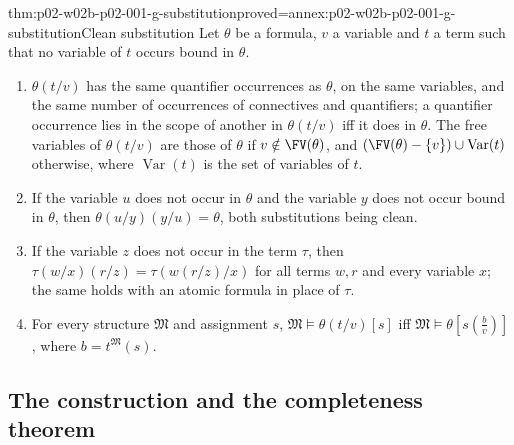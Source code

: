 \begin{hblemma}{thm:p02-w02b-p02-001-g-substitution}{proved=annex:p02-w02b-p02-001-g-substitution}{Clean substitution}
Let \(\theta\) be a formula, \(v\) a variable and \(t\) a term such that no
variable of \(t\) occurs bound in \(\theta\).
\begin{enumerate}
\item \(\theta(t/v)\) has the same quantifier occurrences as \(\theta\), on
      the same variables, and the same number of occurrences of connectives
      and quantifiers; a quantifier occurrence lies in the scope of another
      in \(\theta(t/v)\) iff it does in \(\theta\).  The free variables of
      \(\theta(t/v)\) are those of \(\theta\) if \(v\notin\FV(\theta)\), and
      \((\FV(\theta)-\{v\})\cup\operatorname{Var}(t)\) otherwise, where
      \(\operatorname{Var}(t)\) is the set of variables of \(t\).
\item If the variable \(u\) does not occur in \(\theta\) and the variable
      \(y\) does not occur bound in \(\theta\), then
      \(\theta(u/y)(y/u)=\theta\), both substitutions being clean.
\item If the variable \(z\) does not occur in the term \(\tau\), then
      \(\tau(w/x)(r/z)=\tau(w(r/z)/x)\) for all terms \(w,r\) and every
      variable \(x\); the same holds with an atomic formula in place of
      \(\tau\).
\item For every structure \(\mathfrak M\) and assignment \(s\),
      \(\mathfrak M\models\theta(t/v)[s]\) iff
      \(\mathfrak M\models\theta[s(\tfrac{b}{v})]\), where
      \(b=t^{\mathfrak M}(s)\).
\end{enumerate}
\end{hblemma}

\subsection{The construction and the completeness theorem}
\label{sec:p02-w02b-p02-001-g-theorem}

